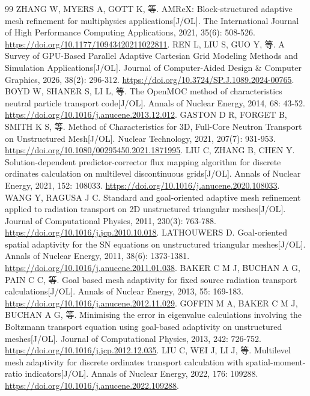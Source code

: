 \documentclass[UTF8, zihao=-4, fontset=none, a4paper]{ctexart}
\begin{document}
\begin{thebibliography}{99}
 ZHANG W, MYERS A, GOTT K, 等. AMReX: Block-structured adaptive mesh refinement for multiphysics applications{[}J/OL{]}. The International Journal of High Performance Computing Applications, 2021, 35(6): 508-526. \url{https://doi.org/10.1177/10943420211022811}.
 REN L, LIU S, GUO Y, 等. A Survey of GPU-Based Parallel Adaptive Cartesian Grid Modeling Methods and Simulation Applications{[}J/OL{]}. Journal of Computer-Aided Design \& Computer Graphics, 2026, 38(2): 296-312. \url{https://doi.org/10.3724/SP.J.1089.2024-00765}.
 BOYD W, SHANER S, LI L, 等. The OpenMOC method of characteristics neutral particle transport code{[}J/OL{]}. Annals of Nuclear Energy, 2014, 68: 43-52. \url{https://doi.org/10.1016/j.anucene.2013.12.012}.
 GASTON D R, FORGET B, SMITH K S, 等. Method of Characteristics for 3D, Full-Core Neutron Transport on Unstructured Mesh{[}J/OL{]}. Nuclear Technology, 2021, 207(7): 931-953. \url{https://doi.org/10.1080/00295450.2021.1871995}.
 LIU C, ZHANG B, CHEN Y. Solution-dependent predictor-corrector flux mapping algorithm for discrete ordinates calculation on multilevel discontinuous grids{[}J/OL{]}. Annals of Nuclear Energy, 2021, 152: 108033. \url{https://doi.org/10.1016/j.anucene.2020.108033}.
 WANG Y, RAGUSA J C. Standard and goal-oriented adaptive mesh refinement applied to radiation transport on 2D unstructured triangular meshes{[}J/OL{]}. Journal of Computational Physics, 2011, 230(3): 763-788. \url{https://doi.org/10.1016/j.jcp.2010.10.018}.
 LATHOUWERS D. Goal-oriented spatial adaptivity for the SN equations on unstructured triangular meshes{[}J/OL{]}. Annals of Nuclear Energy, 2011, 38(6): 1373-1381. \url{https://doi.org/10.1016/j.anucene.2011.01.038}.
 BAKER C M J, BUCHAN A G, PAIN C C, 等. Goal based mesh adaptivity for fixed source radiation transport calculations{[}J/OL{]}. Annals of Nuclear Energy, 2013, 55: 169-183. \url{https://doi.org/10.1016/j.anucene.2012.11.029}.
 GOFFIN M A, BAKER C M J, BUCHAN A G, 等. Minimising the error in eigenvalue calculations involving the Boltzmann transport equation using goal-based adaptivity on unstructured meshes{[}J/OL{]}. Journal of Computational Physics, 2013, 242: 726-752. \url{https://doi.org/10.1016/j.jcp.2012.12.035}.
 LIU C, WEI J, LI J, 等. Multilevel mesh adaptivity for discrete ordinates transport calculation with spatial-moment-ratio indicators{[}J/OL{]}. Annals of Nuclear Energy, 2022, 176: 109288. \url{https://doi.org/10.1016/j.anucene.2022.109288}.

\end{thebibliography}
\end{document}
